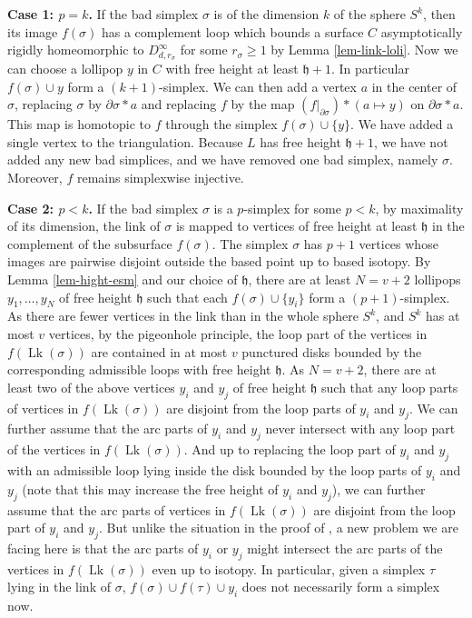 \documentclass[11pt, a4paper]{amsart}
\theoremstyle{definition}
\DeclareMathOperator{\Lk}{Lk}
\begin{document}
\textbf{Case 1: $p=k$.} If the bad simplex $\sigma$ is of the dimension $k$ of the sphere $S^k$, then its image $f(\sigma)$ has a complement loop which bounds a surface $C$ asymptotically rigidly homeomorphic to $D^{\infty}_{d,r_\sigma}$ for some $r_\sigma\geq 1$ by Lemma \ref{lem-link-loli}. Now we can choose a lollipop $y$ in $C$ with free height at least $\mathfrak{h}+1$. In particular $f(\sigma) \cup y$ form a $(k+1)$-simplex. We can then add a vertex $a$ in the center of $\sigma$, replacing $\sigma$ by $\partial \sigma \ast a$ and replacing $f$ by the map $(f|_{\partial\sigma})\ast (a \mapsto y)$ on $\partial\sigma \ast a$. This map is homotopic to $f$ through the simplex $f(\sigma)\cup \{y\}$. We have added a single vertex to the triangulation. Because $L$ has free height $\mathfrak{h}+1$, we have not added any new bad simplices, and we have removed one bad simplex, namely $\sigma$. Moreover, $f$ remains simplexwise injective. 

\textbf{Case 2: $p<k$.} If the bad simplex $\sigma$ is a $p$-simplex for some $p<k$, by maximality of its dimension, the link of $\sigma$ is mapped to vertices of free height at least $\mathfrak{h}$ in the complement of the subsurface $f(\sigma)$. 
The simplex $\sigma$ has $p+1$ vertices whose images are pairwise disjoint outside the based point up to based isotopy.
By Lemma \ref{lem-hight-esm} and  our choice of $\mathfrak{h}$, there are at least $N= v+2$ lollipops  $y_1,\dots,y_N$ of free height $\mathfrak{h}$ such that each $f(\sigma)\cup\{y_i\}$ form a $(p+1)$-simplex. As there are fewer vertices in the link than in the whole sphere $S^k$, and $S^k$ has at most $v$ vertices, by the pigeonhole principle, the loop part of the vertices in $f(\Lk(\sigma))$ are contained in at most $v$ punctured disks bounded by the corresponding admissible loops with free height $\mathfrak{h}$. As $N=v+2$, 
there are at least two of the above vertices $y_i$ and $y_j$ of free height $\mathfrak{h}$ such that any loop parts of  vertices in $f(\Lk(\sigma))$ are disjoint from the loop parts of $y_i$ and $y_j$. We can further assume that the arc parts of $y_i$ and $y_j$ never intersect with any loop part of the vertices in $f(\Lk(\sigma))$. And up to replacing the loop part of $y_i$ and $y_j$ with an admissible loop lying inside the disk bounded by the loop parts of  $y_i$ and $y_j$ (note that this may increase the free height of $y_i$ and $y_j$), we can further assume that the arc parts of  vertices in $f(\Lk(\sigma))$ are disjoint from the loop part of $y_i$ and $y_j$.  But unlike the situation in the proof of \cite[Proposition 3.1]{SW19}, a new  problem we are facing here is that the arc parts of $y_i$ or $y_j$ might intersect the arc parts of the vertices in $f(\Lk(\sigma))$ even up to  isotopy. In particular,  given a simplex $\tau$ lying in the link of $\sigma$,  $f(\sigma)\cup f(\tau)\cup y_i$ does not necessarily form a simplex now.
\end{document}
